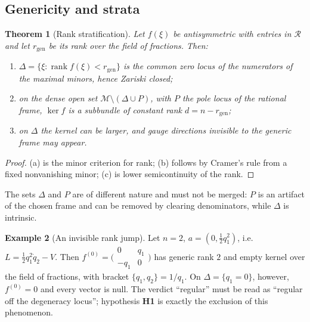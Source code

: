 \documentclass[12pt]{article}
\theoremstyle{plain}
\newtheorem{theorem}{Theorem}[section]
\theoremstyle{definition}
\newtheorem{example}[theorem]{Example}
\theoremstyle{remark}
\DeclareMathOperator{\rank}{rank}
\newcommand{\Mm}{\mathcal{M}}
\newcommand{\Rring}{\mathcal{R}}
\begin{document}
	\subsection{Genericity and strata}
	
	\begin{theorem}[Rank stratification]
		\label{thm:strat}
		Let $f(\xi)$ be antisymmetric with entries in $\Rring$ and let
		$r_{\mathrm{gen}}$ be its rank over the field of fractions. Then:
		\begin{enumerate}[label=(\alph*),leftmargin=2.2em,itemsep=0.25em]
			\item $\Delta=\{\xi:\rank f(\xi)<r_{\mathrm{gen}}\}$ is the common zero locus
			of the numerators of the maximal minors, hence Zariski closed;
			\item on the dense open set $\Mm\setminus(\Delta\cup P)$, with $P$ the pole
			locus of the rational frame, $\ker f$ is a subbundle of constant rank
			$d=n-r_{\mathrm{gen}}$;
			\item on $\Delta$ the kernel can be larger, and gauge directions invisible to
			the generic frame may appear.
		\end{enumerate}
	\end{theorem}
	
	\begin{proof}
		(a) is the minor criterion for rank; (b) follows by Cramer's rule from a fixed
		nonvanishing minor; (c) is lower semicontinuity of the rank.
	\end{proof}
	
	The sets $\Delta$ and $P$ are of different nature and must not be merged: $P$ is
	an artifact of the chosen frame and can be removed by clearing denominators,
	while $\Delta$ is intrinsic.
	
	\begin{example}[An invisible rank jump]
		\label{ex:jump}
		Let $n=2$, $a=(0,\tfrac12 q_{1}^{2})$, i.e.
		$L=\tfrac12 q_{1}^{2}\dot q_{2}-V$. Then
		$f^{(0)}=\bigl(\begin{smallmatrix}0&q_{1}\\-q_{1}&0\end{smallmatrix}\bigr)$ has
		generic rank $2$ and empty kernel over the field of fractions, with bracket
		$\{q_{1},q_{2}\}=1/q_{1}$. On $\Delta=\{q_{1}=0\}$, however, $f^{(0)}=0$ and
		every vector is null. The verdict ``regular'' must be read as ``regular off the
		degeneracy locus''; hypothesis \textbf{H1} is exactly the exclusion of this
		phenomenon.
	\end{example}
	
\end{document}
